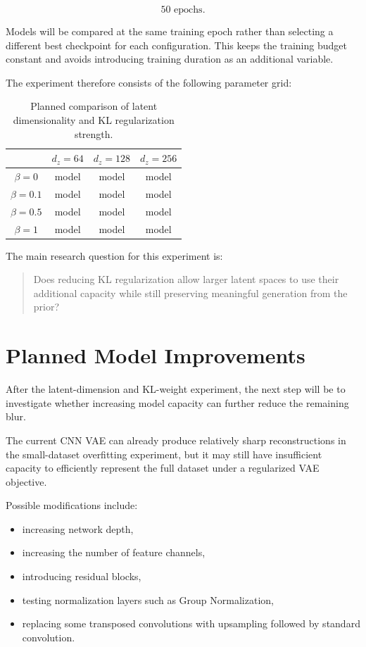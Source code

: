 \documentclass[a4paper,11pt]{article}
\begin{document}
\[
50 \text{ epochs}.
\]

Models will be compared at the same training epoch rather than selecting a different best checkpoint for each configuration. This keeps the training budget constant and avoids introducing training duration as an additional variable.

The experiment therefore consists of the following parameter grid:

\begin{table}[h]
\centering
\begin{tabular}{c|ccc}
\hline
 & $d_z=64$ & $d_z=128$ & $d_z=256$ \\
\hline
$\beta=0$   & model & model & model \\
$\beta=0.1$ & model & model & model \\
$\beta=0.5$ & model & model & model \\
$\beta=1$   & model & model & model \\
\hline
\end{tabular}
\caption{Planned comparison of latent dimensionality and KL regularization strength.}
\label{tab:latent_beta_grid}
\end{table}

The main research question for this experiment is:

\begin{quote}
Does reducing KL regularization allow larger latent spaces to use their additional capacity while still preserving meaningful generation from the prior?
\end{quote}


\section{Planned Model Improvements}

After the latent-dimension and KL-weight experiment, the next step will be to investigate whether increasing model capacity can further reduce the remaining blur.

The current CNN VAE can already produce relatively sharp reconstructions in the small-dataset overfitting experiment, but it may still have insufficient capacity to efficiently represent the full dataset under a regularized VAE objective.

Possible modifications include:

\begin{itemize}
    \item increasing network depth,
    \item increasing the number of feature channels,
    \item introducing residual blocks,
    \item testing normalization layers such as Group Normalization,
    \item replacing some transposed convolutions with upsampling followed by standard convolution.
\end{itemize}
\end{document}
